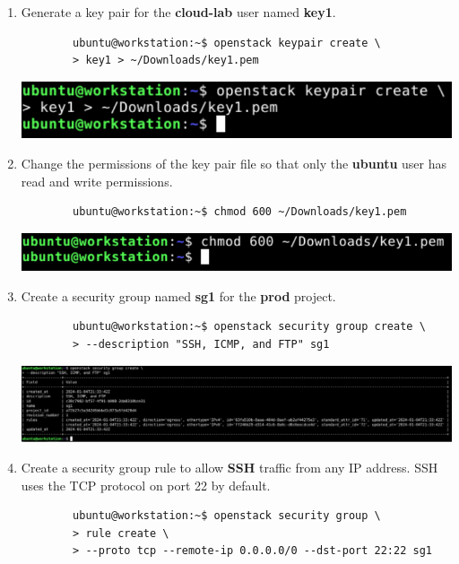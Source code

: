 \documentclass[letterpaper, 12pt]{article}
\begin{document}
\begin{enumerate}
    \item Generate a key pair for the \textbf{cloud-lab} user named \textbf{key1}.
    \begin{lstlisting}
        ubuntu@workstation:~$ openstack keypair create \
        > key1 > ~/Downloads/key1.pem
    \end{lstlisting}

    \begin{center}
        \includegraphics[width=\linewidth]{images/part1/step27.png}
    \end{center}

    \item Change the permissions of the key pair file so that only the \textbf{ubuntu} user has read and write
    permissions.
    \begin{lstlisting}
        ubuntu@workstation:~$ chmod 600 ~/Downloads/key1.pem
    \end{lstlisting}

    \begin{center}
        \includegraphics[width=\linewidth]{images/part1/step28.png}
    \end{center}

    \item Create a security group named \textbf{sg1} for the \textbf{prod} project.
    \begin{lstlisting}
        ubuntu@workstation:~$ openstack security group create \
        > --description "SSH, ICMP, and FTP" sg1
    \end{lstlisting}    

    \begin{center}
        \includegraphics[width=\linewidth]{images/part1/step29.png}
    \end{center}

    \item Create a security group rule to allow \textbf{SSH} traffic from any IP address. SSH uses the TCP protocol on
    port 22 by default.
    \begin{lstlisting}
        ubuntu@workstation:~$ openstack security group \
        > rule create \
        > --proto tcp --remote-ip 0.0.0.0/0 --dst-port 22:22 sg1
    \end{lstlisting}


\end{enumerate}
\end{document}
